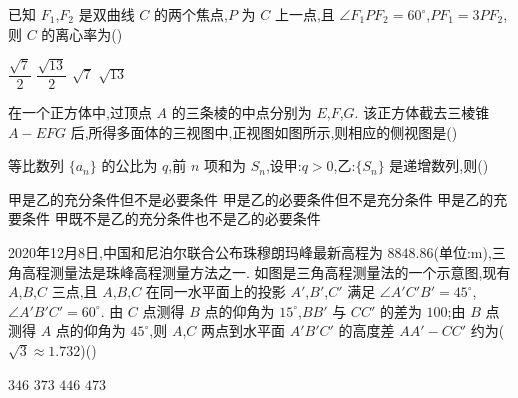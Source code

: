 \begin{problem}
已知 \(F_1\),\(F_2\) 是双曲线 \(C\) 的两个焦点,\(P\) 为 \(C\) 上一点,且 \(\angle F_1PF_2=60^\circ\),\(PF_1=3PF_2\),则 \(C\) 的离心率为(\quad)

\choices
    {\(\dfrac{\sqrt{7}}{2}\)}
    {\(\dfrac{\sqrt{13}}{2}\)}
    {\(\sqrt{7}\)}
    {\(\sqrt{13}\)}

\end{problem}

\begin{problem}
在一个正方体中,过顶点 \(A\) 的三条棱的中点分别为 \(E\),\(F\),\(G\). 该正方体截去三棱锥 \(A-EFG\) 后,所得多面体的三视图中,正视图如图所示,则相应的侧视图是(\quad)


\choices
    {}
    {}
    {}
    {}

\end{problem}

\begin{problem}
等比数列 \(\{a_n\}\) 的公比为 \(q\),前 \(n\) 项和为 \(S_n\),设甲:\(q>0\),乙:\(\{S_n\}\) 是递增数列,则(\quad)

\choices
    {甲是乙的充分条件但不是必要条件}
    {甲是乙的必要条件但不是充分条件}
    {甲是乙的充要条件}
    {甲既不是乙的充分条件也不是乙的必要条件}

\end{problem}

\begin{problem}
2020年12月8日,中国和尼泊尔联合公布珠穆朗玛峰最新高程为 \(8848.86\)(单位:\(\mathrm{m}\)),三角高程测量法是珠峰高程测量方法之一. 如图是三角高程测量法的一个示意图,现有 \(A\),\(B\),\(C\) 三点,且 \(A\),\(B\),\(C\) 在同一水平面上的投影 \(A'\),\(B'\),\(C'\) 满足 \(\angle A'C'B'=45^\circ\),\(\angle A'B'C'=60^\circ\). 由 \(C\) 点测得 \(B\) 点的仰角为 \(15^\circ\),\(BB'\) 与 \(CC'\) 的差为 \(100\);由 \(B\) 点测得 \(A\) 点的仰角为 \(45^\circ\),则 \(A\),\(C\) 两点到水平面 \(A'B'C'\) 的高度差 \(AA'-CC'\) 约为(\(\sqrt{3}\approx 1.732\))(\quad)


\choices
    {\(346\)}
    {\(373\)}
    {\(446\)}
    {\(473\)}

\end{problem}

